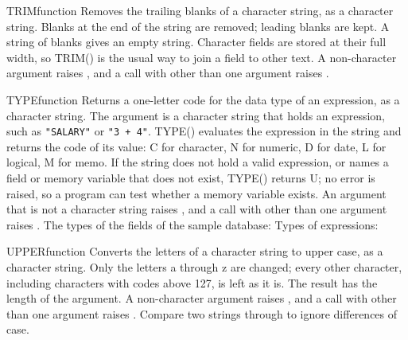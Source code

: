 \begin{XbaseEntry}{TRIM}{function}
Removes the trailing blanks of a character string, as a character string.
\Syntax
{}
\Usage
Blanks at the end of the string are removed; leading blanks are kept. A string of blanks gives an empty string. Character fields are stored at their full width, so TRIM() is the usual way to join a field to other text. A non-character argument raises , and a call with other than one argument raises .
\Examples
{}
\end{XbaseEntry}

\begin{XbaseEntry}{TYPE}{function}
Returns a one-letter code for the data type of an expression, as a character string.
\Syntax
{}
\Usage
The argument is a character string that holds an expression, such as \texttt{"SALARY"} or \texttt{"3 + 4"}.  TYPE() evaluates the expression in the string and returns the code of its value: C for character, N for numeric, D for date, L for logical, M for memo.  If the string does not hold a valid expression, or names a field or memory variable that does not exist, TYPE() returns U; no error is raised, so a program can test whether a memory variable exists.  An argument that is not a character string raises , and a call with other than one argument raises .
\Examples
The types of the fields of the sample database:
Types of expressions:
\end{XbaseEntry}

\begin{XbaseEntry}{UPPER}{function}
Converts the letters of a character string to upper case, as a character string.
\Syntax
{}
\Usage
Only the letters a through z are changed; every other character, including characters with codes above 127, is left as it is. The result has the length of the argument. A non-character argument raises , and a call with other than one argument raises .
\Tips
Compare two strings through  to ignore differences of case.
\Examples
{}
\end{XbaseEntry}


